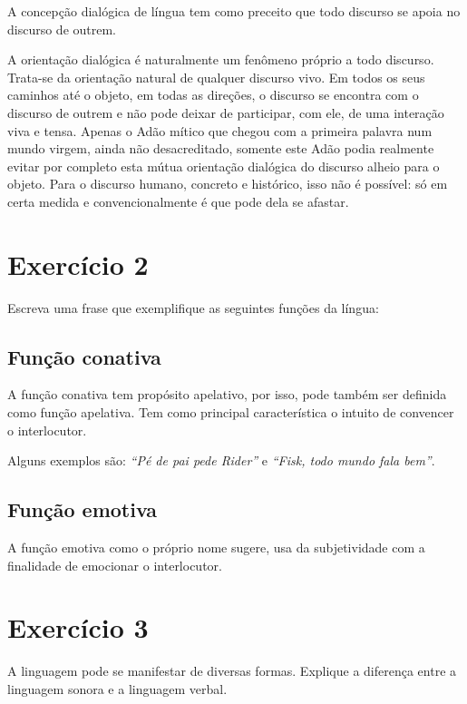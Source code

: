 \documentclass[
	12pt,				%
	openright,			%
	oneside,			%
	a4paper,			%
	english,			%
	french,				%
	spanish,			%
	brazil				%
	]{abntex2}
\begin{document}
A concepção dialógica de língua tem como preceito que todo discurso
se apoia no discurso de outrem.

\begin{citacao}
A orientação dialógica é naturalmente um fenômeno próprio a
todo discurso. Trata-se da orientação natural de qualquer discurso
vivo. Em todos os seus caminhos até o objeto, em todas
as direções, o discurso se encontra com o discurso de outrem
e não pode deixar de participar, com ele, de uma interação
viva e tensa. Apenas o Adão mítico que chegou com a primeira
palavra num mundo virgem, ainda não desacreditado, somente
este Adão podia realmente evitar por completo esta mútua
orientação dialógica do discurso alheio para o objeto. Para o
discurso humano, concreto e histórico, isso não é possível:
só em certa medida e convencionalmente é que pode dela se
afastar.
\hbox{\cite{bakhtin}}
\end{citacao}

\chapter{Exercício 2}

Escreva uma frase que exemplifique as seguintes funções da língua:

\section{Função conativa}

A função conativa tem propósito apelativo, por isso, pode também
ser definida como função apelativa. Tem como principal característica
o intuito de convencer o interlocutor.

\par
Alguns exemplos são: \textit{``Pé de pai pede Rider''} e
\textit{``Fisk, todo mundo fala bem''}.

\section{Função emotiva}
A função emotiva como o próprio nome sugere, usa da subjetividade com
a finalidade de emocionar o interlocutor.

\chapter{Exercício 3}

A linguagem pode se manifestar de diversas formas.
Explique a diferença entre a linguagem sonora e a linguagem verbal.
\end{document}
